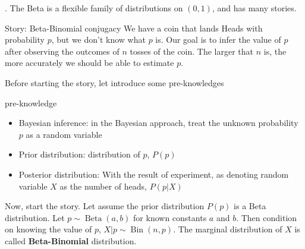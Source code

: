 \documentclass[8pt]{beamer}
\newcommand{\tb}[1]{\textbf{#1}}
\newcommand{\Bin}[2]{\operatorname{Bin}\!\left(#1,#2\right)}
\newcommand{\Beta}[2]{\operatorname{Beta}\!\left(#1, #2\right)}
\begin{document}
\begin{frame}{.}
    The Beta is a flexible family of distributions on $(0,1)$, and has many stories.

    \begin{block}{Story: Beta-Binomial conjugacy}
        We have a coin that lands Heads with probability $p$, but we don't know what $p$ is. Our goal is to infer the value of $p$ after observing the outcomes of $n$ tosses of the coin. The larger that $n$ is, the more accurately we should be able to estimate $p$.
    \end{block}

    Before starting the story, let introduce some pre-knowledges

    \begin{block}{pre-knowledge}
        \begin{itemize}
            \item Bayesian inference: in the Bayesian approach, treat the unknown probability $p$ as a random variable
            \item Prior distribution: distribution of $p$, $P(p)$
            \item Posterior distribution: With the result of experiment, as denoting random variable $X$ as the number of heads, $P(p|X)$
        \end{itemize}
    \end{block}

    Now, start the story. Let assume the prior distribution $P(p)$ is a Beta distribution. Let $p \sim \Beta{a}{b}$ for known constants $a$ and $b$. Then condition on knowing the value of $p$, $X|p \sim \Bin{n}{p}$. The marginal distribution of $X$ is called \tb{Beta-Binomial} distribution.

\end{frame}
\end{document}
